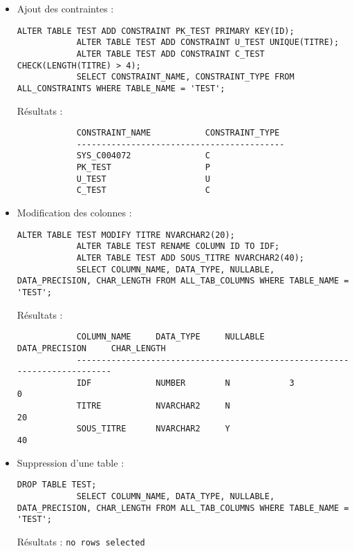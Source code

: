 \documentclass[12pt,a4paper]{article}
\begin{document}
\begin{enumerate}
\begin{itemize}
\begin{verbatim}
		\end{verbatim}
		\item Ajout des contraintes :
		\begin{lstlisting}[style=OracleSQL]
			ALTER TABLE TEST ADD CONSTRAINT PK_TEST PRIMARY KEY(ID);
			ALTER TABLE TEST ADD CONSTRAINT U_TEST UNIQUE(TITRE);
			ALTER TABLE TEST ADD CONSTRAINT C_TEST CHECK(LENGTH(TITRE) > 4);
			SELECT CONSTRAINT_NAME, CONSTRAINT_TYPE FROM ALL_CONSTRAINTS WHERE TABLE_NAME = 'TEST';
		\end{lstlisting}
		Résultats :
		\begin{verbatim}
			CONSTRAINT_NAME           CONSTRAINT_TYPE
			------------------------------------------
			SYS_C004072               C
			PK_TEST                   P
			U_TEST                    U
			C_TEST                    C
		\end{verbatim}
		\item Modification des colonnes :
		\begin{lstlisting}[style=OracleSQL]
			ALTER TABLE TEST MODIFY TITRE NVARCHAR2(20);
			ALTER TABLE TEST RENAME COLUMN ID TO IDF;
			ALTER TABLE TEST ADD SOUS_TITRE NVARCHAR2(40);
			SELECT COLUMN_NAME, DATA_TYPE, NULLABLE, DATA_PRECISION, CHAR_LENGTH FROM ALL_TAB_COLUMNS WHERE TABLE_NAME = 'TEST';
		\end{lstlisting}
		Résultats :
		\begin{verbatim}
			COLUMN_NAME     DATA_TYPE     NULLABLE     DATA_PRECISION     CHAR_LENGTH
			--------------------------------------------------------------------------
			IDF             NUMBER        N            3                  0
			TITRE           NVARCHAR2     N                               20
			SOUS_TITRE      NVARCHAR2     Y                               40
		\end{verbatim}
		\item Suppression d'une table :
		\begin{lstlisting}[style=OracleSQL]
			DROP TABLE TEST;
			SELECT COLUMN_NAME, DATA_TYPE, NULLABLE, DATA_PRECISION, CHAR_LENGTH FROM ALL_TAB_COLUMNS WHERE TABLE_NAME = 'TEST';
		\end{lstlisting}
		Résultats : \texttt{no rows selected}
	\end{itemize}
\end{enumerate}
\end{document}
